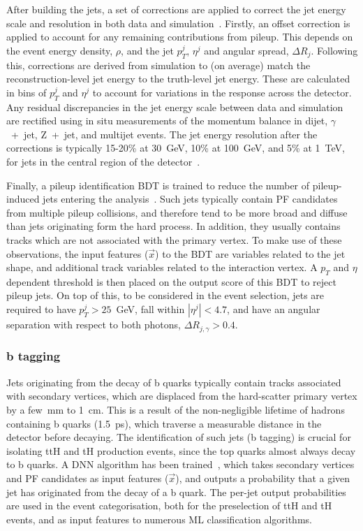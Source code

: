 After building the jets, a set of corrections are applied to correct the jet energy scale and resolution in both data and simulation~\cite{Khachatryan:2016kdb}. Firstly, an offset correction is applied to account for any remaining contributions from pileup. This depends on the event energy density, $\rho$, and the jet $p_T^j$, $\eta^j$ and angular spread, $\Delta R_j$. Following this, corrections are derived from simulation to (on average) match the reconstruction-level jet energy to the truth-level jet energy. These are calculated in bins of $p_T^j$ and $\eta^j$ to account for variations in the response across the detector. Any residual discrepancies in the jet energy scale between data and simulation are rectified using in situ measurements of the momentum balance in dijet, $\gamma$~+~jet, Z~+~jet, and multijet events. The jet energy resolution after the corrections is typically 15-20\% at 30~GeV, 10\% at 100~GeV, and 5\% at 1~TeV, for jets in the central region of the detector~\cite{Khachatryan:2016kdb}.

Finally, a pileup identification BDT is trained to reduce the number of pileup-induced jets entering the analysis~\cite{Sirunyan:2020foa}. Such jets typically contain PF candidates from multiple pileup collisions, and therefore tend to be more broad and diffuse than jets originating form the hard process. In addition, they usually contains tracks which are not associated with the primary vertex. To make use of these observations, the input features ($\vec{x}$) to the BDT are variables related to the jet shape, and additional track variables related to the interaction vertex. A $p_T$ and $\eta$ dependent threshold is then placed on the output score of this BDT to reject pileup jets. On top of this, to be considered in the event selection, jets are required to have $p_T^j>25$~GeV, fall within $|\eta^j|<4.7$, and have an angular separation with respect to both photons, $\Delta R_{j,\gamma}>0.4$.

\subsubsection{b tagging}
Jets originating from the decay of b quarks typically contain tracks associated with secondary vertices, which are displaced from the hard-scatter primary vertex by a few~mm to 1~cm. This is a result of the non-negligible lifetime of hadrons containing b quarks (1.5~ps), which traverse a measurable distance in the detector before decaying. The identification of such jets (b tagging) is crucial for isolating ttH and tH production events, since the top quarks almost always decay to b quarks. A DNN algorithm has been trained~\cite{Sirunyan:2017ezt}, which takes secondary vertices and PF candidates as input features ($\vec{x}$), and outputs a probability that a given jet has originated from the decay of a b quark. The per-jet output probabilities are used in the event categorisation, both for the preselection of ttH and tH events, and as input features to numerous ML classification algorithms.

